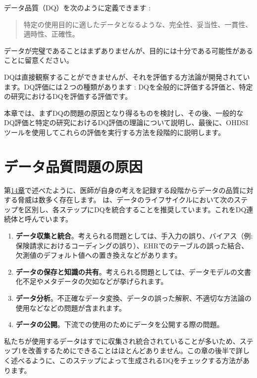 \documentclass[
  11pt]{book}
\providecommand{\tightlist}{%
  \setlength{\itemsep}{0pt}\setlength{\parskip}{0pt}}
\theoremstyle{definition}
\theoremstyle{definition}
\theoremstyle{definition}
\theoremstyle{definition}
\theoremstyle{remark}
\begin{document}
データ品質（DQ）を次のように定義できます \citep{roebuck_2012}: 

\begin{quote}
特定の使用目的に適したデータとなるような、完全性、妥当性、一貫性、適時性、正確性。
\end{quote}

データが完璧であることはまずありませんが、目的には十分である可能性があることに留意ください。

DQは直接観察することができませんが、それを評価する方法論が開発されています。DQ評価には２つの種類があります \citep{weiskopf_2013}: DQを全般的に評価する評価と、特定の研究におけるDQを評価する評価です。

本章では、まずDQの問題の原因となり得るものを検討し、その後、一般的なDQ評価と特定の研究におけるDQ評価の理論について説明し、最後に、OHDSIツールを使用してこれらの評価を実行する方法を段階的に説明します。

\section{データ品質問題の原因}\label{ux30c7ux30fcux30bfux54c1ux8ceaux554fux984cux306eux539fux56e0}

第\href{https://ohdsi.github.io/TheBookOfOhdsi/EvidenceQuality.html\#EvidenceQuality}{14章}で述べたように、医師が自身の考えを記録する段階からデータの品質に対する脅威は数多く存在します。\citet{dasu_2003} は、データのライフサイクルにおいて次のステップを区別し、各ステップにDQを統合することを推奨しています。これをDQ連続体と呼んでいます。

\begin{enumerate}
\def\labelenumi{\arabic{enumi}.}
\tightlist
\item
  \textbf{データ収集と統合}。考えられる問題としては、手入力の誤り、バイアス（例: 保険請求におけるコーディングの誤り）、EHRでのテーブルの誤った結合、欠測値のデフォルト値への置き換えなどがあります。
\item
  \textbf{データの保存と知識の共有}。考えられる問題としては、データモデルの文書化不足やメタデータの欠如などが挙げられます。
\item
  \textbf{データ分析}。不正確なデータ変換、データの誤った解釈、不適切な方法論の使用などなどの問題が含まれます。
\item
  \textbf{データの公開}。下流での使用のためにデータを公開する際の問題。
\end{enumerate}

私たちが使用するデータはすでに収集され統合されていることが多いため、ステップ1を改善するためにできることはほとんどありません。この章の後半で詳しく述べるように、このステップによって生成されるDQをチェックする方法があります。
\end{document}

